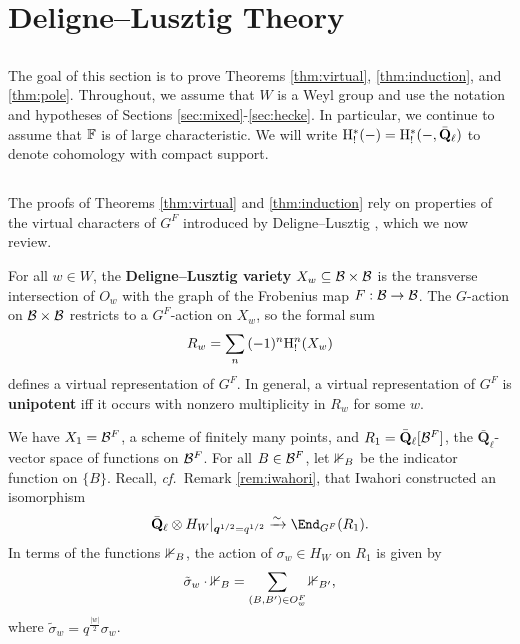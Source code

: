 \documentclass[a4paper,10pt,leqno]{amsart}
\theoremstyle{plain}
\theoremstyle{plain}
\theoremstyle{plain}
\theoremstyle{definition}
\theoremstyle{remark}
\newcommand{\dfemph}[1]{\textbf{#1}}
\newcommand{\Q}{\bm{q}}
\newcommand{\QL}{\bar{\mathbf{Q}}_\ell}
\begin{document}
\newpage
\section{Deligne--Lusztig Theory}\label{sec:dl}

\subsection{}

The goal of this section is to prove Theorems \ref{thm:virtual}, \ref{thm:induction}, and \ref{thm:pole}.
Throughout, we assume that $W$ is a Weyl group and use the notation and hypotheses of Sections \ref{sec:mixed}-\ref{sec:hecke}.
In particular, we continue to assume that $\bb{F}$ is of large characteristic.
We will write $\ur{H}_!^\ast(-) = \ur{H}_!^\ast(-, \QL)$ to denote cohomology with compact support.

\subsection{}

The proofs of Theorems \ref{thm:virtual} and \ref{thm:induction} rely on properties of the virtual characters of $G^F$ introduced by Deligne--Lusztig \cite{dl}, which we now review.

For all $w \in W$, the \dfemph{Deligne--Lusztig variety} $X_w \subseteq \cal{B} \times \cal{B}$ is the transverse intersection of $O_w$ with the graph of the Frobenius map $F : \cal{B} \to \cal{B}$.
The $G$-action on $\cal{B} \times \cal{B}$ restricts to a $G^F$-action on $X_w$, so the formal sum
\begin{align}
R_w = \sum_n
{(-1)^n}\ur{H}_!^n(X_w)
\end{align}
defines a virtual representation of $G^F$.
In general, a virtual representation of $G^F$ is \dfemph{unipotent} iff it occurs with nonzero multiplicity in $R_w$ for some $w$.

We have $X_1 = \cal{B}^F$, a scheme of finitely many points, and $R_1 = \QL[\cal{B}^F]$, the $\QL$-vector space of functions on $\cal{B}^F$.
For all $B \in \cal{B}^F$, let $\bb{1}_B$ be the indicator function on $\{B\}$.
Recall, \emph{cf.}\ Remark \ref{rem:iwahori}, that Iwahori constructed an isomorphism
\begin{align}
\QL \otimes H_W|_{\Q^{1/2} = q^{1/2}} \xrightarrow{\sim} \End_{G^F}(R_1).
\end{align}
In terms of the functions $\bb{1}_B$, the action of $\sigma_w \in H_W$ on $R_1$ is given by
\begin{align}\label{eq:hecke-operator}
\tilde{\sigma}_w \cdot \bb{1}_B = \sum_{(B, B') \in O_w^F}
\bb{1}_{B'},
\end{align}
where $\tilde{\sigma}_w = q^{\frac{|w|}{2}} \sigma_w$.
\end{document}
